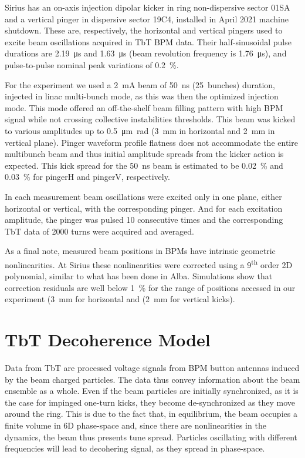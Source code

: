\documentclass[a4paper,
               keeplastbox,   %
               ]{jacow}
\begin{document}
Sirius has an on-axis injection dipolar kicker in ring non-dispersive sector 01SA and a vertical pinger in dispersive sector 19C4, installed in April 2021 machine shutdown. These are, respectively, the horizontal and vertical pingers used to excite beam oscillations acquired in TbT BPM data. Their half-sinusoidal pulse durations are \SI{2.19}{\micro\second} and \SI{1.63}{\micro\second} (beam revolution frequency is \SI{1.76}{\micro\second}), and pulse-to-pulse nominal peak variations of \SI{0.2}{\percent}. 

For the experiment we used a \SI{2}{\milli\ampere} beam of \SI{50}{\nano\second} (25~bunches) duration, injected in linac multi-bunch mode, as this was then the optimized injection mode. This mode offered an off-the-shelf beam filling pattern with high BPM signal while not crossing collective instabilities thresholds. This beam was kicked to various amplitudes up to \SI{0.5}{\micro\meter\radian} (\SI{3}{\milli\meter} in horizontal and \SI{2}{\milli\meter} in vertical plane). Pinger waveform profile flatness does not accommodate the entire multibunch beam and thus initial amplitude spreads from the kicker action is expected. This kick spread for the \SI{50}{\nano\second} beam is estimated to be \SI{0.02}{\percent} and \SI{0.03}{\percent} for pingerH and pingerV, respectively.

In each measurement beam oscillations were excited only in one plane, either horizontal or vertical, with the corresponding pinger. And for each excitation amplitude, the pinger was pulsed 10 consecutive times and the corresponding TbT data of 2000 turns were acquired and averaged.

As a final note, measured beam positions in BPMs have intrinsic geometric nonlinearities. At Sirius these nonlinearities were corrected using a 9\textsuperscript{th} order 2D polynomial, similar to what has been done in Alba\cite{alba}. Simulations show that correction residuals are well below \SI{1}{\percent} for the range of positions accessed in our experiment\cite{daniel} (\SI{3}{\milli\meter} for horizontal and (\SI{2}{\milli\meter} for vertical kicks).

\section{TbT Decoherence Model}

Data from TbT are processed voltage signals from BPM button antennas induced by the beam charged particles. The data thus convey information about the beam ensemble as a whole. Even if the beam particles are initially synchronized, as it is the case for impinged one-turn kicks, they become de-synchronized as they move around the ring. This is due to the fact that, in equilibrium, the beam occupies a finite volume in 6D phase-space and, since there are nonlinearities in the dynamics, the beam thus presents tune spread. Particles oscillating with different frequencies will lead to decohering signal, as they spread in phase-space.
\end{document}
